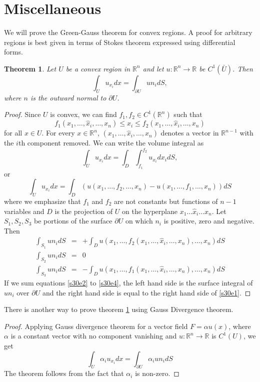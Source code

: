 \documentclass{article}
\theoremstyle{plain}
\newtheorem{thm}{Theorem}
\numberwithin{thm}{section}
\theoremstyle{plain}
\numberwithin{prop}{section}
\theoremstyle{definition}
\numberwithin{defn}{section}
\theoremstyle{remark}
\numberwithin{equation}{section}
\begin{document}
\section{Miscellaneous}\label{s30}
We will prove the Green-Gauss theorem for convex regions. A proof for arbitrary regions is best given in terms of
Stokes theorem expressed using differential forms.
\begin{thm}\label{s30t1}
Let $U$ be a convex region in $\mathbb{R}^n$ and let $u: \mathbb{R}^n \rightarrow \mathbb{R}$ be $C^1(\bar{U})$.
Then 
\[
\int_U u_{x_i}dx = \int_{\partial U} un_i dS,
\]
where $n$ is the outward normal to $\partial U$.
\end{thm}
\begin{proof}
Since $U$ is convex, we can find $f_1, f_2 \in C^1(\mathbb{R}^n)$ such that
\[
f_1(x_1, \ldots, \hat{x}_i, \ldots, x_n) \le x_i \le f_2(x_1, \ldots, \hat{x}_i, \ldots, x_n)
\]
for all $x \in U$. For every $x \in \mathbb{R}^n$, $(x_1, \ldots, \hat{x}_i, \ldots, x_n)$ denotes a vector in 
$\mathbb{R}^{n-1}$ with the $i$th component removed. We can write the volume integral as
\[
\int_U u_{x_i}dx = \int_{D}\int_{f_1}^{f_2} u_{x_i}dx_i dS,
\]
or
\begin{equation}\label{s30e1}
\int_U u_{x_i}dx = 
\int_{D}\left(u(x_1, \ldots, f_2, \ldots, x_n) - u(x_1, \ldots, f_1, \ldots, x_n)\right) dS
\end{equation}
where we emphasize that $f_1$ and $f_2$ are not constants but functions of $n-1$ variables and $D$ is the 
projection of $U$ on the hyperplane $x_1 \ldots \hat{x}_i \ldots x_n$. Let $S_1, S_2, S_3$ be portions of the
surface $\partial U$ on which $n_i$ is positive, zero and negative. Then
\begin{eqnarray}
\int_{S_1} u n_i dS &=& +\int_D u(x_1,\ldots,f_2(x_1,\ldots,\hat{x}_i,\ldots,x_n),\ldots,x_n)dS \label{s30e2} \\
\int_{S_2} u n_i dS &=& 0 \label{s30e3} \\
\int_{S_3} u n_i dS &=& -\int_D u(x_1,\ldots,f_1(x_1,\ldots,\hat{x}_i,\ldots,x_n),\ldots,x_n)dS \label{s30e4}
\end{eqnarray}
If we sum equations \eqref{s30e2} to \eqref{s30e4}, the left hand side is the surface integral of $u n_i$ over
$\partial U$ and the right hand side is equal to the right hand side of \eqref{s30e1}.
\end{proof}

There is another way to prove theorem \ref{s30t1} using Gauss Divergence theorem.
\begin{proof}
Applying Gauss divergence theorem for a vector field $F = \alpha u(x)$, where $\alpha$ is a constant vector with
no component vanishing and $u : \mathbb{R}^n \rightarrow \mathbb{R}$ is $C^{1}(U)$, we get
\[
\int_U \alpha_i u_{x_i}dx = \int_{\partial U}\alpha_i u n_i dS
\]
The theorem follows from the fact that $\alpha_i$ is non-zero. 
\end{proof}


\end{document}
